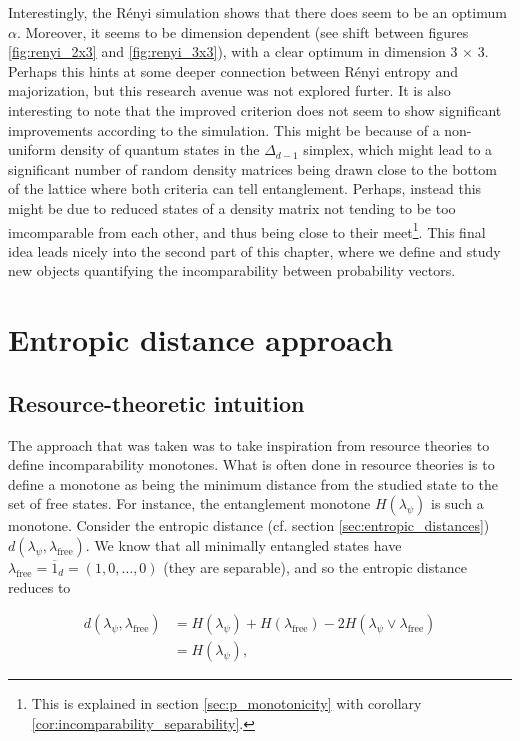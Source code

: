 Interestingly, the Rényi simulation shows that there does seem to be an optimum $\alpha$. Moreover, it seems to be dimension dependent (see shift between figures \ref{fig:renyi_2x3} and \ref{fig:renyi_3x3}), with a clear optimum in dimension 3 $\times$ 3. Perhaps this hints at some deeper connection between Rényi entropy and majorization, but this research avenue was not explored furter. It is also interesting to note that the improved criterion does not seem to show significant improvements according to the simulation. This might be because of a non-uniform density of quantum states in the $\Delta_{d-1}$ simplex, which might lead to a significant number of random density matrices being drawn close to the bottom of the lattice where both criteria can tell entanglement. Perhaps, instead this might be due to reduced states of a density matrix not tending to be too imcomparable from each other, and thus being close to their meet\footnote{This is explained in section \ref{sec:p_monotonicity} with corollary \ref{cor:incomparability_separability}.}. This final idea leads nicely into the second part of this chapter, where we define and study new objects quantifying the incomparability between probability vectors.



\section{Entropic distance approach}

\subsection{Resource-theoretic intuition}

The approach that was taken was to take inspiration from resource theories to define incomparability monotones. What is often done in resource theories is to define a monotone as being the minimum distance from the studied state to the set of free states. For instance, the entanglement monotone $H(\lambda_\psi)$ is such a monotone. Consider the entropic distance (cf. section \ref{sec:entropic_distances}) $d(\lambda_\psi, \lambda_{\text{free}})$. We know that all minimally entangled states have $\lambda_\text{free} = \overline{1}_d = (1, 0, \dots, 0)$ (they are separable), and so the entropic distance reduces to

\begin{align}
    d(\lambda_\psi, \lambda_\text{free}) &= H(\lambda_\psi) + H(\lambda_\text{free}) - 2 H(\lambda_\psi \vee \lambda_\text{free})\\
                                      &= H(\lambda_\psi),
\end{align}

